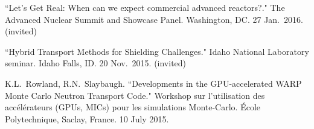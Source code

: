 \begin{bibsection}

\item ``Let’s Get Real: When can we expect commercial
advanced reactors?." The Advanced Nuclear Summit and Showcase Panel. Washington, DC. 27 Jan.\ 2016. (invited)

\item ``Hybrid Transport Methods for Shielding Challenges." Idaho National Laboratory seminar. Idaho Falls, ID. 20 Nov.\ 2015. (invited) 

\item K.L.\ Rowland, R.N.\ Slaybaugh. ``Developments in the GPU-accelerated WARP Monte Carlo Neutron Transport Code." Workshop sur l'utilisation des acc\'{e}l\'{e}rateurs (GPUs, MICs) pour les simulations Monte-Carlo. \'{E}cole Polytechnique, Saclay, France. 10 July 2015. 








\end{bibsection}
